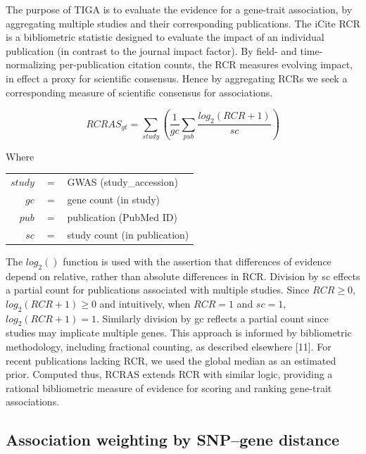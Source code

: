 The purpose of TIGA is to evaluate the evidence for a gene-trait association, by aggregating multiple studies and their corresponding publications.  The iCite RCR\cite{Hutchins2016-hs} is a bibliometric statistic designed to evaluate the impact of an individual publication (in contrast to the journal impact factor).  By field- and time-normalizing per-publication citation counts, the RCR measures evolving impact, in effect a proxy for scientific consensus.  Hence by aggregating RCRs we seek a corresponding measure of scientific consensus for associations.

\begin{equation} RCRAS_{gt} = \sum_{study} \left(\frac{1}{gc} \sum_{pub} \frac{log_{2}(RCR + 1)}{sc}\right)
\end{equation}

Where\\
\begin{center}
\begin{tabular}{ r c l }
    $study$ & $=$ & GWAS (study\_accession)\\
	$gc$ & $=$ & gene count (in study)	\\
	$pub$ & $=$ & publication (PubMed ID)	\\
	$sc$ & $=$ & study count (in publication)	\\
\end{tabular}
\end{center}

The $log_2()$ function is used with the assertion that differences of evidence depend on relative, rather than absolute differences in RCR. Division by sc effects a partial count for publications associated with multiple studies.  Since $RCR \geq 0$, $log_2(RCR + 1) \geq 0$ and intuitively, when $RCR = 1$ and $sc = 1$, $log_2(RCR + 1) = 1$. Similarly division by gc reflects a partial count since studies may implicate multiple genes. This approach is informed by bibliometric methodology, including fractional counting, as described elsewhere [11]. For recent publications lacking RCR, we used the global median as an estimated prior. Computed thus, RCRAS extends RCR with similar logic, providing a rational bibliometric measure of evidence for scoring and ranking gene-trait associations. 

\subsection{Association weighting by SNP–gene distance}

